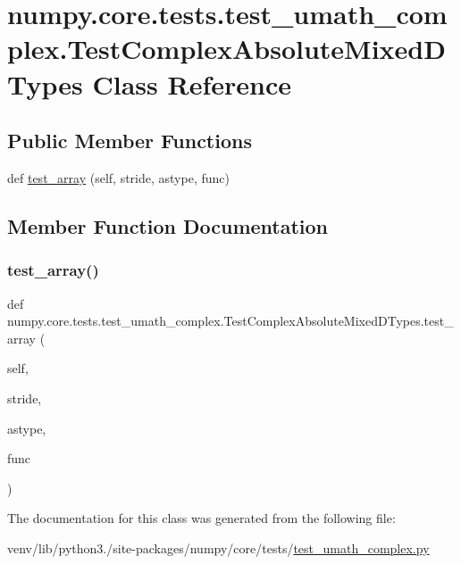 \hypertarget{classnumpy_1_1core_1_1tests_1_1test__umath__complex_1_1TestComplexAbsoluteMixedDTypes}{}\section{numpy.\+core.\+tests.\+test\+\_\+umath\+\_\+complex.\+Test\+Complex\+Absolute\+Mixed\+D\+Types Class Reference}
\label{classnumpy_1_1core_1_1tests_1_1test__umath__complex_1_1TestComplexAbsoluteMixedDTypes}
\subsection*{Public Member Functions}
\begin{DoxyCompactItemize}
\item 
def \hyperlink{classnumpy_1_1core_1_1tests_1_1test__umath__complex_1_1TestComplexAbsoluteMixedDTypes_a1fd02d1a8f7a42b1e8c6a01a97891bb3}{test\+\_\+array} (self, stride, astype, func)
\end{DoxyCompactItemize}


\subsection{Member Function Documentation}
\mbox{\label{classnumpy_1_1core_1_1tests_1_1test__umath__complex_1_1TestComplexAbsoluteMixedDTypes_a1fd02d1a8f7a42b1e8c6a01a97891bb3}} 
\subsubsection{\texorpdfstring{test\+\_\+array()}{test\_array()}}
{\footnotesize\ttfamily def numpy.\+core.\+tests.\+test\+\_\+umath\+\_\+complex.\+Test\+Complex\+Absolute\+Mixed\+D\+Types.\+test\+\_\+array (\begin{DoxyParamCaption}\item[{}]{self,  }\item[{}]{stride,  }\item[{}]{astype,  }\item[{}]{func }\end{DoxyParamCaption})}



The documentation for this class was generated from the following file\+:\begin{DoxyCompactItemize}
\item 
venv/lib/python3./site-\/packages/numpy/core/tests/\hyperlink{test__umath__complex_8py}{test\+\_\+umath\+\_\+complex.\+py}\end{DoxyCompactItemize}
